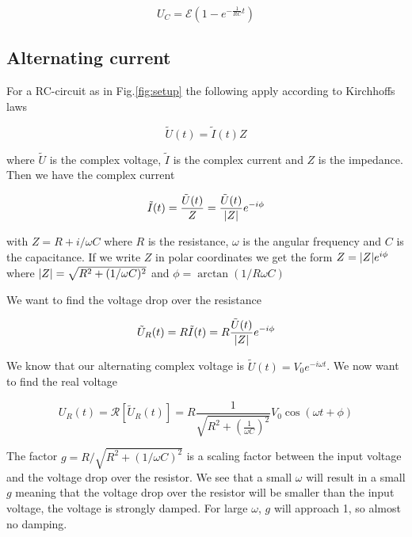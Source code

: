 \documentclass[../main/main.tex]{subfiles}
\begin{document}
\begin{equation}
  U_C = \mathcal{E} \left( 1 - e^{- \frac{1}{RC} t} \right)
\end{equation}

\subsection*{Alternating current}

For a RC-circuit as in Fig.\ref{fig:setup} the following apply according to Kirchhoffs laws

\begin{equation}
	\tilde{U}(t) = \tilde{I}(t)Z
\end{equation}

where \( \tilde{U} \) is the complex voltage, \( \tilde{I} \) is the complex current and \( Z \) is the impedance. Then we have the complex current

\begin{equation}
	\tilde{I}(t) = \frac{\tilde{U}(t)}{Z} = \frac{\tilde{U}(t)}{ \abs{Z}} e^{-i \phi}
\end{equation}

with \( Z = R + i/ \omega C \) where \( R \) is the resistance, \(\omega \) is the angular frequency and \( C \) is the capacitance.
If we write \( Z \) in polar coordinates we get the form \( Z = \abs{Z} e^{i \phi} \) where \( \abs{Z} = \sqrt{R^2 + (1/\omega C)^2} \) and \( \phi = \arctan(1 / R \omega C ) \)

We want to find the voltage drop over the resistance

\begin{equation}
	\tilde{U}_R(t) = R \tilde{I}(t) = R \frac{\tilde{U}(t)}{ \abs{Z}} e^{-i \phi}
\end{equation}

We know that our alternating complex voltage is \( \tilde{U}(t) = V_0 e^{-i \omega t } \).
We now want to find the real voltage

\begin{equation}
	U_R(t) = \mathcal{R}[\tilde{U}_R(t)] = R \frac{1}{ \sqrt{R^2 + \left( \frac{1}{ \omega C } \right)^2 } } V_0 \cos ( \omega t + \phi)
\end{equation}

The factor \( g = R / \sqrt{R^2 + ( 1 / \omega C )^2} \) is a scaling factor between the input voltage and the voltage drop over the resistor.
We see that a small \( \omega \) will result in a small \( g \) meaning that the voltage drop over the resistor will be smaller than the input voltage, the voltage is strongly damped.
For large \( \omega \), \( g \) will approach 1, so almost no damping.
\end{document}
